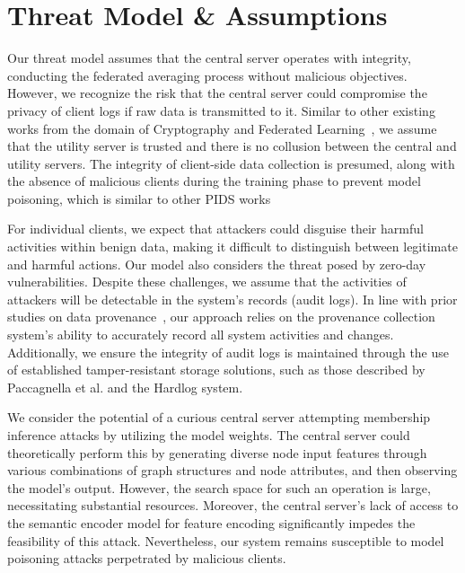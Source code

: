 
\section{Threat Model \& Assumptions}





Our threat model assumes that the central server operates with integrity, conducting the federated averaging process without malicious objectives. However, we recognize the risk that the central server could compromise the privacy of client logs if raw data is transmitted to it. Similar to other existing works from the domain of Cryptography and Federated Learning~\cite{roy2020crypte,wu2022federated},  we assume that the utility server is trusted and there is no collusion between the central and utility servers. The integrity of client-side data collection is presumed, along with the absence of malicious clients during the training phase to prevent model poisoning, which is similar to other PIDS works~\cite{cheng2023kairos,flash2024,yangprographer,wang2022threatrace,provdetector2020}

For individual clients, we expect that attackers could disguise their harmful activities within benign data, making it difficult to distinguish between legitimate and harmful actions. Our model also considers the threat posed by zero-day vulnerabilities. Despite these challenges, we assume that the activities of attackers will be detectable in the system's records (audit logs). In line with prior studies on data provenance~\cite{nodoze2019, priotracker2018, mzx2016, bates2017transparent,omegalog,rapsheet2020,provthings2018,dossier,inam2023sok,poirot2019}, our approach relies on the provenance collection system's ability to accurately record all system activities and changes. Additionally, we ensure the integrity of audit logs is maintained through the use of established tamper-resistant storage solutions, such as those described by Paccagnella et al.\cite{paccagnella2020custos} and the Hardlog system\cite{hardlog}.

We consider the potential of a curious central server attempting membership inference attacks by utilizing the model weights. The central server could theoretically perform this by generating diverse node input features through various combinations of graph structures and node attributes, and then observing the model's output. However, the search space for such an operation is large, necessitating substantial resources. Moreover, the central server's lack of access to the semantic encoder model for feature encoding significantly impedes the feasibility of this attack. Nevertheless, our system remains susceptible to model poisoning attacks perpetrated by malicious clients.

